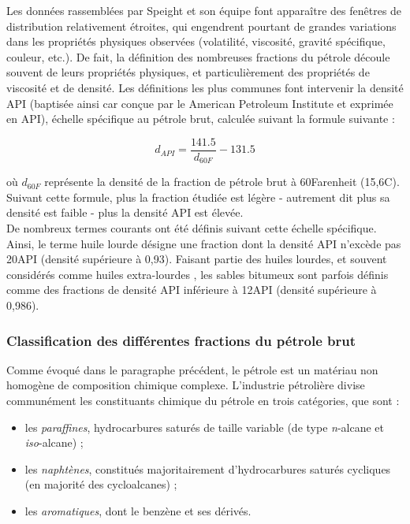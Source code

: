 Les données rassemblées par Speight et son équipe font apparaître des fenêtres de distribution relativement étroites, qui engendrent pourtant de grandes variations dans les propriétés physiques observées (volatilité, viscosité, gravité spécifique, couleur, etc.). De fait, la définition des nombreuses fractions du pétrole découle souvent de leurs propriétés physiques, et particulièrement des propriétés de viscosité et de densité. Les définitions les plus communes font intervenir la densité API (baptisée ainsi car conçue par le \og American Petroleum Institute \fg{} et exprimée en \degre API), échelle spécifique au pétrole brut, calculée suivant la formule suivante : 

\begin{equation}
d_{API}=\dfrac{141.5}{d_{60F}}-131.5
\end{equation}

où $d_{60F}$ représente la densité de la fraction de pétrole brut à 60\degre Farenheit (15,6\degre C).\\ 

Suivant cette formule, plus la fraction étudiée est légère - autrement dit plus sa densité est faible - plus la densité API est élevée.\\ 

De nombreux termes courants ont été définis suivant cette échelle spécifique. Ainsi, le terme \og huile lourde \fg{} désigne une fraction dont la densité API n'excède pas 20\degre API (densité supérieure à 0,93). Faisant partie des huiles lourdes, et souvent considérés comme huiles \og extra-lourdes \fg{}, les sables bitumeux sont parfois définis comme des fractions de densité API inférieure à 12\degre API (densité supérieure à 0,986). 

\subsubsection{Classification des différentes fractions du pétrole brut}

Comme évoqué dans le paragraphe précédent, le pétrole est un matériau non homogène de composition chimique complexe. L'industrie pétrolière divise communément les constituants chimique du pétrole en trois catégories, que sont : 

\begin{itemize}
	\item les \textit{paraffines}, hydrocarbures saturés de taille variable (de type \textit{n}-alcane et \textit{iso}-alcane) ;
	\item les \textit{naphtènes}, constitués majoritairement d'hydrocarbures saturés cycliques (en majorité des cycloalcanes) ;
	\item les \textit{aromatiques}, dont le benzène et ses dérivés.
\end{itemize} 

